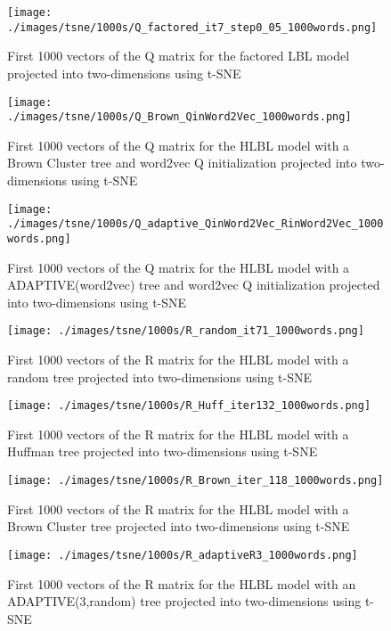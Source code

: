 \begin{figure}[h]
\texttt{[image: ./images/tsne/1000s/Q\_factored\_it7\_step0\_05\_1000words.png]} 
\centering
\caption{First 1000 vectors of the Q matrix for the factored LBL model projected into two-dimensions using t-SNE}
\end{figure}

\begin{figure}[h]
\texttt{[image: ./images/tsne/1000s/Q\_Brown\_QinWord2Vec\_1000words.png]} 
\centering
\caption{First 1000 vectors of the Q matrix for the HLBL model with a Brown Cluster tree and word2vec Q initialization projected into two-dimensions using t-SNE}
\end{figure}

\begin{figure}[h]
\texttt{[image: ./images/tsne/1000s/Q\_adaptive\_QinWord2Vec\_RinWord2Vec\_1000words.png]} 
\centering
\caption{First 1000 vectors of the Q matrix for the HLBL model with a ADAPTIVE(word2vec) tree and word2vec Q initialization projected into two-dimensions using t-SNE}
\end{figure}


\begin{figure}[h]
\texttt{[image: ./images/tsne/1000s/R\_random\_it71\_1000words.png]} 
\centering
\caption{First 1000 vectors of the R matrix for the HLBL model with a random tree projected into two-dimensions using t-SNE}
\end{figure}

\begin{figure}[h]
\texttt{[image: ./images/tsne/1000s/R\_Huff\_iter132\_1000words.png]} 
\centering
\caption{First 1000 vectors of the R matrix for the HLBL model with a Huffman tree projected into two-dimensions using t-SNE}
\end{figure}

\begin{figure}[h]
\texttt{[image: ./images/tsne/1000s/R\_Brown\_iter\_118\_1000words.png]} 
\centering
\caption{First 1000 vectors of the R matrix for the HLBL model with a Brown Cluster tree projected into two-dimensions using t-SNE}
\end{figure}

\begin{figure}[h]
\texttt{[image: ./images/tsne/1000s/R\_adaptiveR3\_1000words.png]} 
\centering
\caption{First 1000 vectors of the R matrix for the HLBL model with an ADAPTIVE(3,random) tree projected into two-dimensions using t-SNE}
\end{figure}

